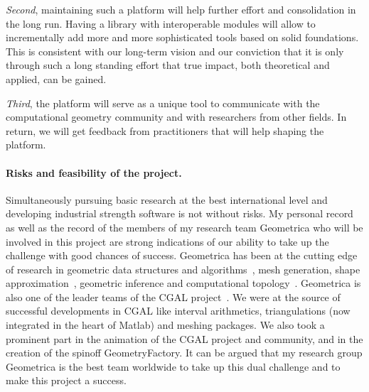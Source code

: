 {\em Second}, maintaining such a platform will help further effort and consolidation in the long run.  Having a library with interoperable modules will allow to incrementally add more and more sophisticated tools based on solid foundations.  This is consistent with our long-term vision and our conviction that it is only through such a long standing effort that true impact, both theoretical and applied, can be gained.

{\em Third}, the platform will serve as a unique tool to communicate with the computational geometry community and with researchers from other fields. In return, we will get feedback from practitioners that will help shaping the platform.

 




\paragraph{Risks and feasibility of the project.} 
Simultaneously pursuing basic research at the best international level and developing industrial strength software is not without risks. %
My personal record as well as the record of the members of my research team  Geometrica who will be involved in this project are strong indications of our ability to take up the challenge with good chances of success.  Geometrica has been at the cutting edge of research in geometric data structures and algorithms~\cite{by-ag-98,geometrica-ecg-book,geometrica-6154a}, mesh generation, shape approximation~\cite{}, geometric inference and computational topology~\cite{geometrica-cseh-07,co-tpr-2008,geometrica-ccl09,geometrica-bgo-09,ccsm-gipm-2011}.  Geometrica is also one of the leader teams of the CGAL project~\cite{cgal}.  We were at the source of successful developments in CGAL like interval arithmetics, triangulations (now integrated in the heart of Matlab) and meshing packages. We also took a prominent part in the animation of the CGAL project and community, and in the creation of the spinoff GeometryFactory. It can be argued that  my research group Geometrica is the best team worldwide to take up this dual challenge and to make this project a success.


